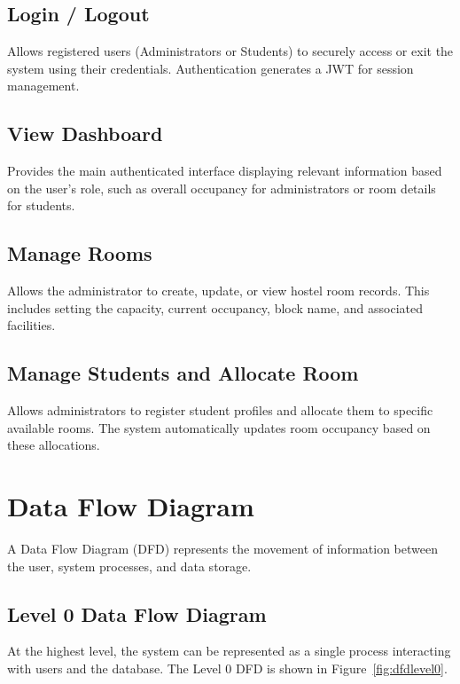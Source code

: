 \subsection{Login / Logout}

Allows registered users (Administrators or Students) to securely access or exit the system using their credentials. Authentication generates a JWT for session management.

\subsection{View Dashboard}

Provides the main authenticated interface displaying relevant information based on the user's role, such as overall occupancy for administrators or room details for students.

\subsection{Manage Rooms}

Allows the administrator to create, update, or view hostel room records. This includes setting the capacity, current occupancy, block name, and associated facilities.

\subsection{Manage Students and Allocate Room}

Allows administrators to register student profiles and allocate them to specific available rooms. The system automatically updates room occupancy based on these allocations.

\section{Data Flow Diagram}

A Data Flow Diagram (DFD) represents the movement of information between the user, system processes, and data storage.

\subsection{Level 0 Data Flow Diagram}

At the highest level, the system can be represented as a single process interacting with users and the database. The Level 0 DFD is shown in Figure~\ref{fig:dfdlevel0}.

